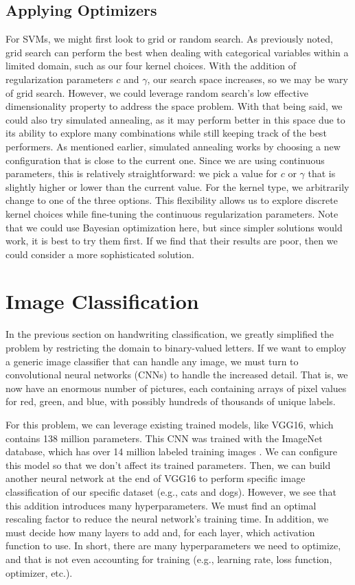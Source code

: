 \documentclass[stu,12pt,floatsintext]{apa7}
\begin{document}
\subsection{Applying Optimizers}

For SVMs, we might first look to grid or random search. As previously noted, grid search can perform the best when dealing with categorical variables within a limited domain, such as our four kernel choices. With the addition of regularization parameters \(c\) and \(\gamma\), our search space increases, so we may be wary of grid search. However, we could leverage random search's low effective dimensionality property to address the space problem. With that being said, we could also try simulated annealing, as it may perform better in this space due to its ability to explore many combinations while still keeping track of the best performers. As mentioned earlier, simulated annealing works by choosing a new configuration that is close to the current one. Since we are using continuous parameters, this is relatively straightforward: we pick a value for \(c\) or \(\gamma\) that is slightly higher or lower than the current value. For the kernel type, we arbitrarily change to one of the three options. This flexibility allows us to explore discrete kernel choices while fine-tuning the continuous regularization parameters. Note that we could use Bayesian optimization here, but since simpler solutions would work, it is best to try them first. If we find that their results are poor, then we could consider a more sophisticated solution. 

\section{Image Classification}

In the previous section on handwriting classification, we greatly simplified the problem by restricting the domain to binary-valued letters. If we want to employ a generic image classifier that can handle any image, we must turn to convolutional neural networks (CNNs) to handle the increased detail. That is, we now have an enormous number of pictures, each containing arrays of pixel values for red, green, and blue, with possibly hundreds of thousands of unique labels.  

For this problem, we can leverage existing trained models, like VGG16, which contains 138 million parameters. This CNN was trained with the ImageNet database, which has over 14 million labeled training images \parencite{gabrielferrer_2025_csci}. We can configure this model so that we don't affect its trained parameters. Then, we can build another neural network at the end of VGG16 to perform specific image classification of our specific dataset (e.g., cats and dogs). However, we see that this addition introduces many hyperparameters. We must find an optimal rescaling factor to reduce the neural network's training time. In addition, we must decide how many layers to add and, for each layer, which activation function to use. In short, there are many hyperparameters we need to optimize, and that is not even accounting for training (e.g., learning rate, loss function, optimizer, etc.). 
\end{document}
